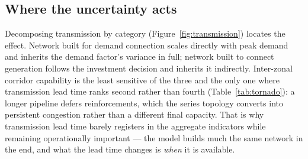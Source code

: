 \subsection{Where the uncertainty acts}
\label{sec:results:where}

Decomposing transmission by category (Figure~\ref{fig:transmission}) locates the
effect. Network built for demand connection scales directly with peak demand and
inherits the demand factor's variance in full; network built to connect generation
follows the investment decision and inherits it indirectly. Inter-zonal corridor
capability is the least sensitive of the three and the only one where transmission
lead time ranks second rather than fourth (Table~\ref{tab:tornado}): a longer pipeline
defers reinforcements, which the series topology converts into persistent congestion
rather than a different final capacity. That is why transmission lead time barely
registers in the aggregate indicators while remaining operationally important --- the
model builds much the same network in the end, and what the lead time changes is
\emph{when} it is available.
